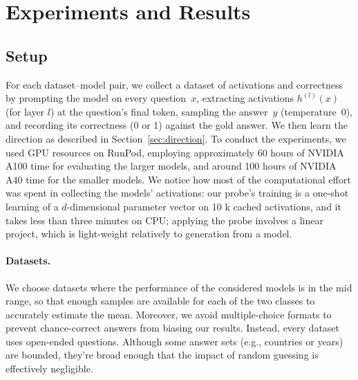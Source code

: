 \documentclass{article} %
\begin{document}
\section{Experiments and Results}
\label{sec:exp}


\subsection{Setup}
For each dataset–model pair, we collect a dataset of activations and correctness by prompting the model on every question~\(x\), extracting activations \(h^{(l)}(x)\)  (for layer $l$) at the question’s final token, sampling the answer~\(y\) (temperature~0), and recording its correctness (0 or 1) against the gold answer. We then learn the direction as described in Section~\ref{sec:direction}. To conduct the experiments, we used GPU resources on RunPod, employing approximately 60 hours of NVIDIA A100 time for evaluating the larger models, and around 100 hours of NVIDIA A40 time for the smaller models. We notice how most of the computational effort was spent in collecting the models' activations: our probe's training is a one-shot learning of a \(d\)-dimensional parameter vector on 10 k cached activations, and it takes less than three minutes on CPU; applying the probe involves a linear project, which is light-weight relatively to generation from a model.

\paragraph{Datasets.}\label{sec:datasets}

We choose datasets where the performance of the considered models is in the mid range, so that enough samples are available for each of the two classes to accurately estimate the mean. %
Moreover, we avoid multiple-choice formats to prevent chance-correct answers from biasing our results. Instead, every dataset uses  open-ended questions. Although some answer sets (e.g., countries or years) are bounded, they’re broad enough that the impact of random guessing is effectively negligible.

\end{document}
